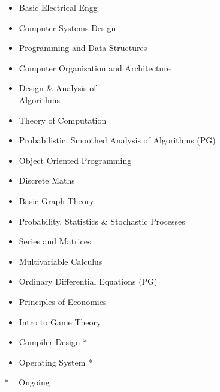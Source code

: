 \documentclass[10pt,article]{article}
\newcommand{\myMargin}{0.15in}
\begin{document}
\begin{multicols*}{2}
\begin{multicols}{2}
\begin{itemize}[ leftmargin=\myMargin]
    \setlength \itemsep{-0.2em}
  \item { Basic Electrical Engg} 
  \item { Computer Systems Design} 
  \item {Programming and Data Structures}
  \item { Computer Organisation and Architecture} 
  \item { Design \& Analysis of  \\ Algorithms} 
  \item { Theory of Computation} 
  \item { Probabilistic, Smoothed Analysis of Algorithms (PG)} 
  \item { Object Oriented Programming} 
  \item { Discrete Maths} 
  \item { Basic Graph Theory} 
  \item { Probability, Statistics \& Stochastic Processes} 
  \item { Series and Matrices} 
  \item { Multivariable Calculus} 
  \item { Ordinary Differential Equations (PG)}  
  \item { Principles of Economics} 
  \item { Intro to Game Theory}   
  \item { Compiler Design *} 
  \item { Operating System *}
\end{itemize}
\hfill  {* ~ Ongoing}

\end{multicols}


\end{multicols*}
\end{document}
